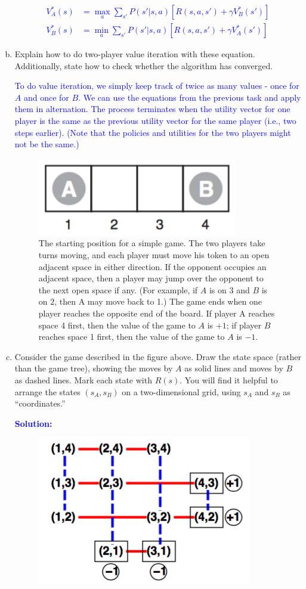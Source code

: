 \documentclass[a4paper]{article}
\begin{document}
\begin{enumerate}[(a)]
\textcolor{blue}{\begin{align*}
V^*_A(s) &= \max_{a} \sum_{s'} P(s'|s,a)[R(s,a,s') + \gamma V^*_B(s')]\\
V^*_B(s) &= \min_{a} \sum_{s'} P(s'|s,a)[R(s,a,s') + \gamma V^*_A(s')]
\end{align*}}

\item Explain how to do two-player value iteration with these equation. Additionally, state how to check whether the algorithm has converged. 

\textcolor{blue}{To do value iteration, we simply keep track of twice as many values - once for $A$ and once for $B$. We can use the equations from the previous task and apply them in alternation. The process terminates when the utility vector for one player is the same as the previous utility vector for the same player (i.e., two steps earlier). (Note that the policies and utilities for the two players might not be the same.)}


\begin{center}
\begin{figure}[h!]
\centering
\includegraphics[width=.25\textwidth]{figs/small-2-player}
\caption{The starting position for a simple game. The two players take turns moving, and each player must move his token to an open adjacent space in either direction. If the opponent occupies an adjacent space, then a player may jump over the opponent to the next open space if any. (For example, if $A$ is on $3$ and $B$ is on $2$, then A may move back to 1.) The game ends when one player reaches the opposite end of the board. If player A reaches space 4 first, then the value of the game to $A$ is $+1$; if player $B$ reaches space 1 first, then the value of the game to $A$ is $−1$.}
\end{figure}
\end{center}

\item Consider the game described in the figure above. Draw the state space (rather than the game tree), showing the moves by $A$ as solid lines and moves by $B$ as dashed lines. Mark each state with $R(s)$. You will find it helpful to arrange the states $(s_A,s_B)$ on a two-dimensional grid, using $s_A$ and $s_B$ as “coordinates.”

\textcolor{blue}{\textbf{Solution:}}
\begin{center}
\begin{figure}[h!]
\centering
\includegraphics[width=.25\textwidth]{figs/state-space}
\end{figure}
\end{center}



\end{enumerate}
\end{document}

